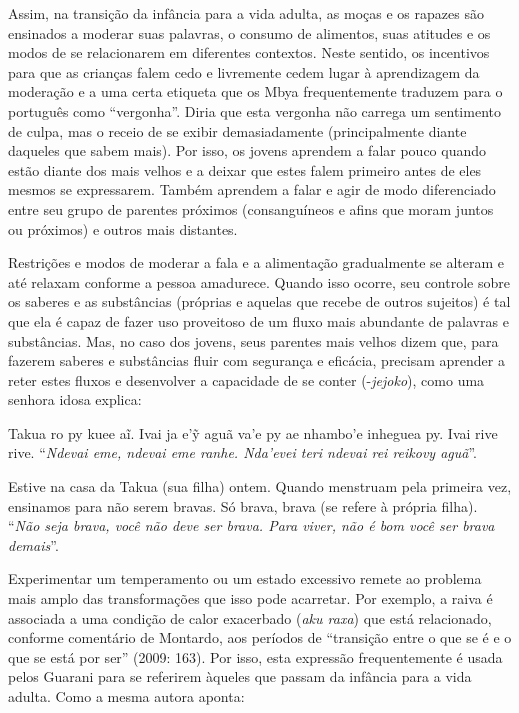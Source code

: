 Assim, na transição da infância para a vida adulta, as moças e os
rapazes são ensinados a moderar suas palavras, o consumo de alimentos,
suas atitudes e os modos de se relacionarem em diferentes contextos.
Neste sentido, os incentivos para que as crianças falem cedo e
livremente cedem lugar à aprendizagem da moderação e a uma certa
etiqueta que os Mbya frequentemente traduzem para o português como
``vergonha''. Diria que esta vergonha não carrega um sentimento de culpa,
mas o receio de se exibir demasiadamente (principalmente diante
daqueles que sabem mais). Por isso, os jovens aprendem a falar pouco
quando estão diante dos mais velhos e a deixar que estes falem primeiro
antes de eles mesmos se expressarem. Também aprendem a falar e agir de
modo diferenciado entre seu grupo de parentes próximos (consanguíneos e
afins que moram juntos ou próximos) e outros mais distantes. 

Restrições e modos de moderar a fala e a alimentação gradualmente se
alteram e até relaxam conforme a pessoa amadurece. Quando isso ocorre,
seu controle sobre os saberes e as substâncias (próprias e aquelas que
recebe de outros sujeitos) é tal que ela é capaz de fazer uso
proveitoso de um fluxo mais abundante de palavras e substâncias. Mas,
no caso dos jovens, seus parentes mais velhos dizem que, para fazerem
saberes e substâncias fluir com segurança e eficácia, precisam aprender
a reter estes fluxos e desenvolver a capacidade de se conter (-\emph{jejoko}),
como uma senhora idosa explica:

\bigskip

\begin{paracol}{2}
\footnotesize
\vspace*{0.3cm}

\noindent
Takua ro py kuee aĩ. Ivai ja e'ỹ aguã va'e py ae nhambo'e inheguea py.
Ivai rive rive. ``\emph{Ndevai eme, ndevai eme ranhe. Nda'evei teri
ndevai rei reikovy aguã}''.

\switchcolumn
\noindent
Estive na casa da Takua (sua filha) ontem. Quando menstruam pela
primeira vez, ensinamos para não serem bravas. Só brava, brava (se
refere à própria filha). ``\emph{Não seja brava, você não deve ser
brava. Para viver, não é bom você ser brava demais}''.
\end{paracol}

\bigskip

Experimentar um temperamento ou um estado excessivo remete ao problema
mais amplo das transformações que isso pode acarretar. Por exemplo, a
raiva é associada a uma condição de calor exacerbado (\emph{aku raxa}) que
está relacionado, conforme comentário de Montardo, aos períodos de
``transição entre o que se é e o que se está por ser'' (2009: 163). Por
isso, esta expressão frequentemente é usada pelos Guarani para se
referirem àqueles que passam da infância para a vida adulta. Como a
mesma autora aponta: 

